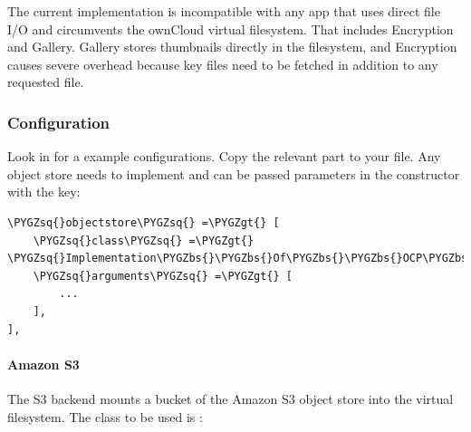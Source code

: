 \documentclass[letterpaper,10pt,english]{sphinxmanual}
\def\PYGZbs{\char`\\}
\def\PYGZgt{\char`\>}
\def\PYGZsq{\char`\'}
\renewcommand\PYGZsq{\textquotesingle}
\begin{document}
The current implementation is incompatible with any app that uses
direct file I/O and circumvents the ownCloud virtual filesystem. That includes
Encryption and Gallery. Gallery stores thumbnails directly in the
filesystem, and Encryption causes severe overhead because key files need
to be fetched in addition to any requested file.


\subsubsection{Configuration}
\label{enterprise_external_storage/s3_swift_as_primary_object_store_configuration:configuration}
Look in  for a example configurations. Copy the
relevant part to your  file. Any object store needs to implement
 and can be passed parameters in the
constructor with the  key:

\begin{Verbatim}[commandchars=\\\{\}]
\PYGZsq{}objectstore\PYGZsq{} =\PYGZgt{} [
    \PYGZsq{}class\PYGZsq{} =\PYGZgt{} \PYGZsq{}Implementation\PYGZbs{}\PYGZbs{}Of\PYGZbs{}\PYGZbs{}OCP\PYGZbs{}\PYGZbs{}Files\PYGZbs{}\PYGZbs{}ObjectStore\PYGZbs{}\PYGZbs{}IObjectStore\PYGZsq{},
    \PYGZsq{}arguments\PYGZsq{} =\PYGZgt{} [
        ...
    ],
],
\end{Verbatim}


\paragraph{Amazon S3}
\label{enterprise_external_storage/s3_swift_as_primary_object_store_configuration:amazon-s3}
The S3 backend mounts a bucket of the Amazon S3 object store
into the virtual filesystem. The class to be used is :
\end{document}
